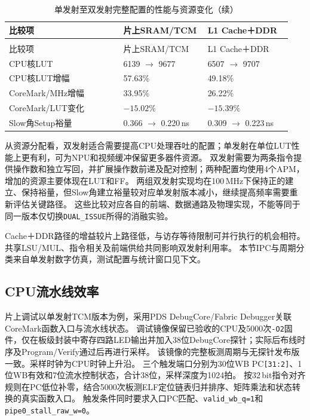 \begin{reporttable}
\begin{longtable}{@{}p{0.38\linewidth}p{0.28\linewidth}p{0.28\linewidth}@{}}
\caption{单发射至双发射完整配置的性能与资源变化}\label{tbl:cpu-issue-tradeoff}\\
\toprule
比较项 & 片上SRAM/TCM & L1 Cache＋DDR \\
\midrule
\endfirsthead
\caption[]{单发射至双发射完整配置的性能与资源变化（续）}\\
\toprule
比较项 & 片上SRAM/TCM & L1 Cache＋DDR \\
\midrule
\endhead
\bottomrule
\endfoot
CPU核LUT & 6139 $\rightarrow$ 9677 & 6507 $\rightarrow$ 9707 \\
CPU核LUT增幅 & 57.63\% & 49.18\% \\
CoreMark/MHz增幅 & 33.95\% & 26.22\% \\
CoreMark/LUT变化 & $-15.02\%$ & $-15.39\%$ \\
Slow角Setup裕量 & 0.366 $\rightarrow$ 0.220\,ns & 0.309 $\rightarrow$ 0.223\,ns \\
\end{longtable}
\end{reporttable}

从资源分配看，双发射适合需要提高CPU处理吞吐的配置；单发射在单位LUT性能上更有利，可为NPU和视频缓冲保留更多器件资源。
双发射需要为两条指令提供操作数和独立写回，并扩展操作数前递及配对控制；两种配置均使用4个APM，增加的资源主要体现在LUT和FF。
两组双发射实现均在100\,MHz下保持正的建立、保持裕量，但Slow角建立裕量较对应单发射版本减小，继续提高频率需要重新评估关键路径。
这些比较对应各自的前端、数据通路及物理实现，不能等同于同一版本仅切换\texttt{DUAL\_ISSUE}所得的消融实验。

Cache＋DDR路径的增益较片上路径低，与访存等待限制可并行执行的机会相符。
共享LSU/MUL、指令相关及前端供给共同影响双发射利用率。
本节IPC与周期分类来自单发射数字仿真，测试配置与统计窗口见下文。

\subsection{CPU流水线效率}

片上调试以单发射TCM版本为例，采用PDS DebugCore/Fabric Debugger关联CoreMark函数入口与流水线状态。
调试镜像保留已验收的CPU及5000次\texttt{-O2}固件，仅在板级封装中寄存四路LED输出并加入38位DebugCore探针；实际后布线时序及Program/Verify通过后再进行采样。
该镜像的完整板测周期与无探针发布版一致。采样时钟为CPU时钟上升沿。
三个触发端口分别为30位WB PC\texttt{[31:2]}、1位WB有效和7位流水控制状态，合计38位，采样深度为1024拍。
按32\,bit指令对齐规则在PC低位补零，结合5000次板测ELF定位链表归并排序、矩阵乘法和状态转换的真实函数入口。
触发条件同时要求入口PC匹配、\texttt{valid\_wb\_q=1}和\texttt{pipe0\_stall\_raw\_w=0}。

